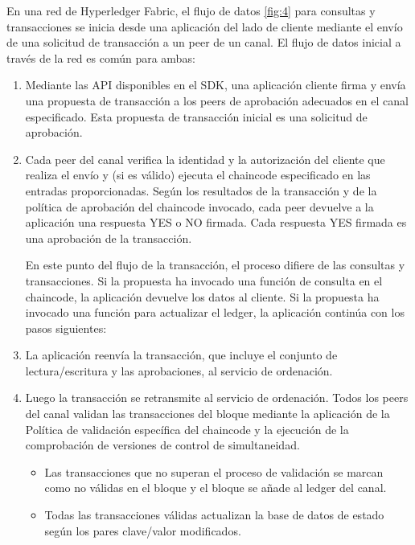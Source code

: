 En una red de Hyperledger Fabric, el flujo de datos \ref{fig:4} para consultas y transacciones se inicia desde una aplicación del lado de cliente mediante el envío de una solicitud de transacción a un peer de un canal. El flujo de datos inicial a través de la red es común para ambas:
\begin{enumerate}
	\item Mediante las API disponibles en el SDK, una aplicación cliente firma y envía una propuesta de transacción a los peers de aprobación adecuados en el canal especificado. Esta propuesta de transacción inicial es una solicitud de aprobación.

	\item Cada peer del canal verifica la identidad y la autorización del cliente que realiza el envío y (si es válido) ejecuta el chaincode especificado en las entradas proporcionadas. Según los resultados de la transacción y de la política de aprobación del chaincode invocado, cada peer devuelve a la aplicación una respuesta YES o NO firmada. Cada respuesta YES firmada es una aprobación de la transacción.

	En este punto del flujo de la transacción, el proceso difiere de las consultas y transacciones. Si la propuesta ha invocado una función de consulta en el chaincode, la aplicación devuelve los datos al cliente. Si la propuesta ha invocado una función para actualizar el ledger, la aplicación continúa con los pasos siguientes:

	\item La aplicación reenvía la transacción, que incluye el conjunto de lectura/escritura y las aprobaciones, al servicio de ordenación.
	
	\item Luego la transacción se retransmite al servicio de ordenación. Todos los peers del canal validan las transacciones del bloque mediante la aplicación de la Política de validación específica del chaincode y la ejecución de la comprobación de versiones de control de simultaneidad.
	\begin{itemize}
		\item Las transacciones que no superan el proceso de validación se marcan como no válidas en el bloque y el bloque se añade al ledger del canal.
		\item Todas las transacciones válidas actualizan la base de datos de estado según los pares clave/valor modificados.
	\end{itemize}

\end{enumerate}

